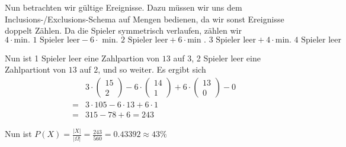 \documentclass[11pt,a4paper,ngerman]{article}
\begin{document}
Nun betrachten wir gültige Ereignisse. Dazu müssen wir uns dem Inclusions-/Exclusions-Schema auf Mengen bedienen, da wir sonst Ereignisse doppelt Zählen.
Da die Spieler symmetrisch verlaufen, zählen wir
\[
    4 \cdot \text{min. 1 Spieler leer} - 6 \cdot \text{ min. 2 Spieler leer} + 6 \cdot \text{min . 3 Spieler leer} + 4 \cdot \text{min. 4 Spieler leer}
\]

Nun ist 1 Spieler leer eine Zahlpartion von $13$ auf $3$, 2 Spieler leer eine Zahlpartiont von $13$ auf $2$, und so weiter. Es ergibt sich
\[\begin{array}{ll}
    &3 \cdot \begin{pmatrix} 15 \\ 2\end{pmatrix} - 6 \cdot \begin{pmatrix} 14 \\ 1 \end{pmatrix} + 6 \cdot \begin{pmatrix} 13 \\ 0 \end{pmatrix} - 0\\
    = & 3 \cdot 105 - 6 \cdot 13 + 6 \cdot 1\\
    = & 315 - 78 + 6 = 243
\end{array}\]

Nun ist $P(X) = \frac{|X|}{|\Omega|} = \frac{243}{560} = 0.43392 \approx 43 \%$


\label{LastPage}
\end{document}
